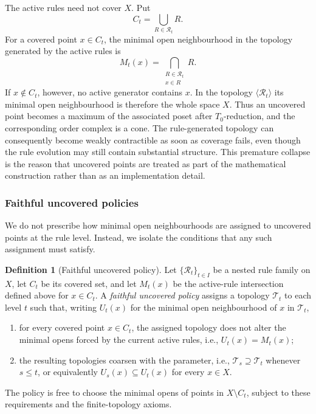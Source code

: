 \documentclass[a4paper,11pt]{article}
\theoremstyle{definition}
\newtheorem{definition}[definition]{Definition}
\theoremstyle{remark}
\begin{document}
The active rules need not cover $X$. Put
$$
C_t = \bigcup_{R\in\mathcal R_t}R.
$$
For a covered point $x\in C_t$, the minimal open neighbourhood in the topology generated by the active rules is
$$
M_t(x) = \bigcap_{\substack{R\in\mathcal R_t\\x\in R}}R.
$$
If $x\notin C_t$, however, no active generator contains $x$. In the topology $\langle\mathcal R_t\rangle$ its minimal open neighbourhood is therefore the whole space $X$. Thus an uncovered point becomes a maximum of the associated poset after $T_0$-reduction, and the corresponding order complex is a cone. The rule-generated topology can consequently become weakly contractible as soon as coverage fails, even though the rule evolution may still contain substantial structure. This premature collapse is the reason that uncovered points are treated as part of the mathematical construction rather than as an implementation detail.


\subsubsection*{Faithful uncovered policies}

We do not prescribe how minimal open neighbourhoods are assigned to uncovered points at the rule level. Instead, we isolate the conditions that any such assignment must satisfy.

\begin{definition}[Faithful uncovered policy]\label{def:faithful-uncovered}
Let $\{\mathcal R_t\}_{t\in I}$ be a nested rule family on $X$, let $C_t$ be its covered set, and let $M_t(x)$ be the active-rule intersection defined above for $x\in C_t$. A \emph{faithful uncovered policy} assigns a topology $\mathcal T_t$ to each level $t$ such that, writing $U_t(x)$ for the minimal open neighbourhood of $x$ in $\mathcal T_t$,
\begin{enumerate}
\item for every covered point $x\in C_t$, the assigned topology does not alter the minimal opens forced by the current active rules, i.e., $U_t(x)=M_t(x)$;
\item the resulting topologies coarsen with the parameter, i.e., $\mathcal T_s\supseteq\mathcal T_t$ whenever $s\leq t$, or equivalently $U_s(x)\subseteq U_t(x)$ for every $x\in X$.
\end{enumerate}
The policy is free to choose the minimal opens of points in $X\setminus C_t$, subject to these requirements and the finite-topology axioms.
\end{definition}
\end{document}
